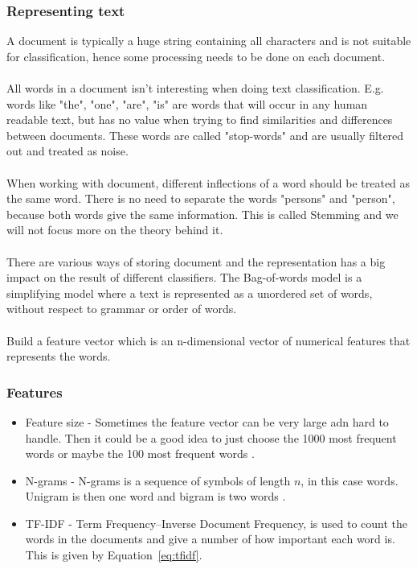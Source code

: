 \subsubsection{Representing text}
A document is typically a huge string containing all characters and is not suitable for classification, hence some processing needs to be done on each document.
\\\\
All words in a document isn't interesting when doing text classification. E.g. words like "the", "one", "are", "is" are words that will occur in any human readable text, but has no value when trying to find similarities and differences between documents. These words are called "stop-words" and are usually filtered out and treated as noise.
\\\\
When working with document, different inflections of a word should be treated as the same word. There is no need to separate the words "persons" and "person", because both words give the same information. This is called Stemming and we will not focus more on the theory behind it.
\\\\
There are various ways of storing document and the representation has a big impact on the result of different classifiers. The Bag-of-words model is a simplifying model where a text is represented as a unordered set of words, without respect to grammar or order of words.
\\\\
Build a feature vector which is an n-dimensional vector of numerical features that represents the words.
\subsubsection{Features}
\begin{itemize}
\item Feature size - Sometimes the feature vector can be very large adn hard to handle. Then it could be a good idea to just choose the 1000 most frequent words or maybe the 100 most frequent words \citep{joachims}. 
\item N-grams - N-grams is a sequence of symbols of length $n$, in this case words. Unigram is then one word and bigram is two words \citep{ngrams_ai}. 
\item TF-IDF - Term Frequency–Inverse Document Frequency, is used to count the words in the documents and give a number of how important each word is. This is given by Equation~\ref{eq:tfidf}.
\end{itemize}

